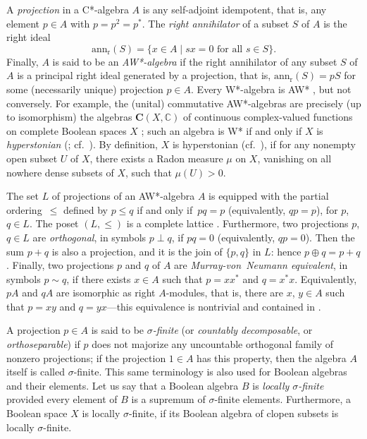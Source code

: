 \documentclass[psamsfonts,reqno]{memo-l}
\theoremstyle{plain}
\theoremstyle{definition}
\theoremstyle{remark}
\numberwithin{equation}{section}
\renewcommand{\iff}{if and only if}
\newcommand{\annr}{\mathrm{ann_r}}
\newcommand{\CC}{\mathbf{C}}
\newcommand{\CCx}{\mathbb{C}}
\newcommand{\set}[1]{\{#1\}}
\newcommand{\setm}[2]{\set{#1\mid#2}}
\begin{document}
A \emph{projection} in a C*-algebra $A$ is any self-adjoint
idempotent, that is, any element $p\in A$ with $p=p^2=p^*$. The \emph{right
annihilator} of a subset $S$ of $A$ is the right ideal
\index{azznr@$\annr(S)$|ii}
   \[
   \annr(S)=\setm{x\in A}{sx=0\text{ for all }s\in S}.
   \]
Finally, $A$ is said to be an \emph{AW*-algebra} if the
right annihilator of any subset $S$ of $A$ is a principal right ideal
generated by a projection, that is, $\annr(S)= pS$ for some (necessarily
unique) projection $p\in A$. Every W*-algebra is AW*
 \cite[\S4, Proposition~9]{Berb}, but not
conversely. For example, the (unital) commutative AW*-algebras are precisely
(up to isomorphism) the algebras
$\CC(X,\CCx)$ of continuous complex-valued functions on complete Boolean
spaces $X$ 
\cite[\S7, Theorem~1]{Berb}; such an algebra is W* if and only if $X$ is
\emph{hyperstonian} 
(\cite[Th\'eor\`eme~2]{Dix51}; cf.~\cite[Theorems 5.3.3,
5.3.4]{BingRen}). By definition, $X$ is
hyperstonian
(cf.~\cite[D\'efinition~3]{Dix51}), if for any nonempty
open subset $U$ of $X$, there exists a Radon measure $\mu$ on $X$, vanishing
on all nowhere dense subsets of $X$, such that $\mu(U)>0$.

The set $L$ of projections of an AW*-algebra $A$ is
equipped with the partial ordering~$\leq$ defined by $p\leq q$ \iff\ $pq=p$
(equivalently, $qp=p$), for $p$, $q\in L$. 
The poset $(L,\leq)$ is a complete lattice
\cite[\S4, Proposition~1]{Berb}. Furthermore, two projections
$p$, $q\in L$ are \emph{orthogonal}, in symbols $p\perp q$, if $pq=0$
(equivalently, $qp=0$). Then the sum $p+q$ is also a projection, and it is
the join of $\set{p,q}$ in $L$: hence $p\oplus q=p+q$. Finally, two
projections $p$ and $q$ of $A$ are \emph{Murray-von~Neumann equivalent}, in
symbols $p\sim q$, if there exists $x\in A$ such that $p=xx^*$ and $q=x^*x$.
Equivalently, $pA$ and $qA$ are isomorphic as right $A$-modules, that
is, there are $x$, $y\in A$ such that $p=xy$ and $q=yx$---this equivalence is
nontrivial and contained in \cite[Theorem~27]{Kapl68}.

A projection $p\in A$ is said to be \emph{$\sigma$-finite} (or
\emph{countably decomposable}, or \emph{orthoseparable}) if $p$ does not
majorize any uncountable orthogonal family of nonzero projections; if the
projection $1\in A$ has this property, then the algebra $A$ itself is called
$\sigma$-finite. This same terminology is also used for Boolean algebras
 and their elements. Let us say that a Boolean algebra
$B$ is \emph{locally $\sigma$-finite} provided every element of $B$
is a supremum of $\sigma$-finite elements. Furthermore, a Boolean
space
$X$ is locally $\sigma$-finite, if its Boolean
algebra of clopen subsets is locally
$\sigma$-finite.
\end{document}
